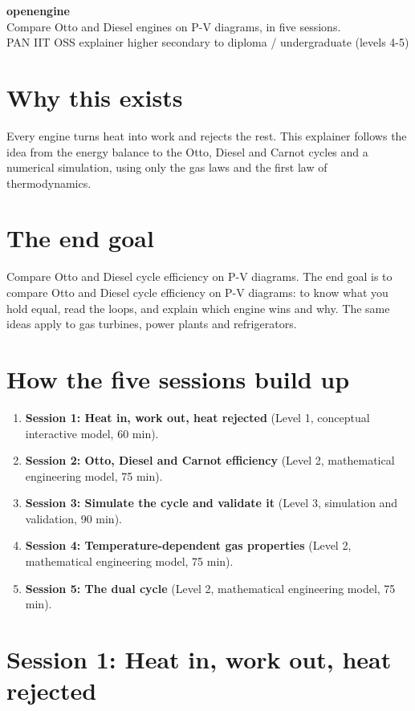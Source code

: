 \documentclass[11pt,a4paper]{article}
\begin{document}
\begin{center}{\LARGE\bfseries openengine}\\[0.4em]{\large Compare Otto and Diesel engines on P-V diagrams, in five sessions.}\\[0.2em]\small PAN IIT OSS explainer \textbullet{} higher secondary to diploma / undergraduate (levels 4-5)\end{center}

\section*{Why this exists}
Every engine turns heat into work and rejects the rest. This explainer follows the idea from the energy balance to the Otto, Diesel and Carnot cycles and a numerical simulation, using only the gas laws and the first law of thermodynamics.

\section*{The end goal}
Compare Otto and Diesel cycle efficiency on P-V diagrams. The end goal is to compare Otto and Diesel cycle efficiency on P-V diagrams: to know what you hold equal, read the loops, and explain which engine wins and why. The same ideas apply to gas turbines, power plants and refrigerators.

\section*{How the five sessions build up}
\begin{enumerate}[nosep]
\item \textbf{Session 1: Heat in, work out, heat rejected} (Level 1, conceptual interactive model, 60 min).
\item \textbf{Session 2: Otto, Diesel and Carnot efficiency} (Level 2, mathematical engineering model, 75 min).
\item \textbf{Session 3: Simulate the cycle and validate it} (Level 3, simulation and validation, 90 min).
\item \textbf{Session 4: Temperature-dependent gas properties} (Level 2, mathematical engineering model, 75 min).
\item \textbf{Session 5: The dual cycle} (Level 2, mathematical engineering model, 75 min).
\end{enumerate}

\section{Session 1: Heat in, work out, heat rejected}
\end{document}
